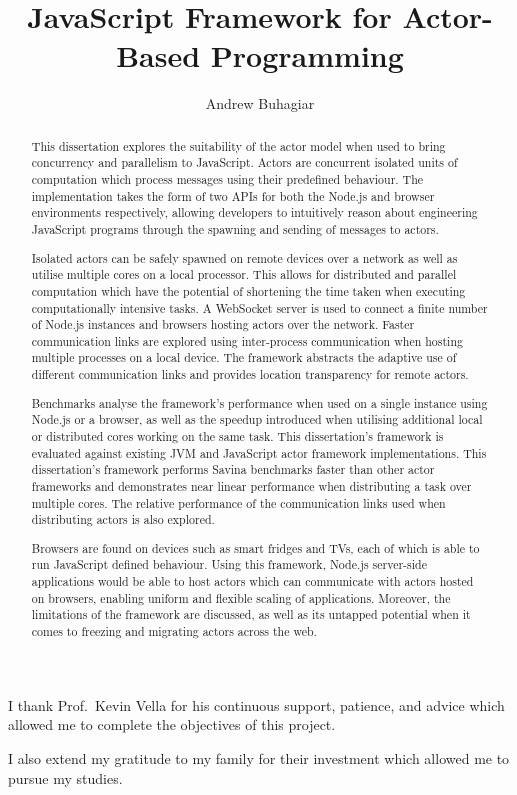 \documentclass[oneside]{um-fict}
\title{JavaScript Framework for Actor-Based Programming}
\author{Andrew Buhagiar}
\begin{document}
\frontmatter 
\maketitle
\begin{acknowledgements}
I thank Prof.\ Kevin Vella for his continuous support, patience, and advice which allowed me to complete the objectives of this project.

I also extend my gratitude to my family for their investment which allowed me to pursue my studies.
\end{acknowledgements}
\begin{abstract}
\hspace{5mm}This dissertation explores the suitability of the actor model when used to bring concurrency and parallelism to JavaScript. Actors are concurrent isolated units of computation which process messages using their predefined behaviour. The implementation takes the form of two APIs for both the Node.js and browser environments respectively, allowing developers to intuitively reason about engineering JavaScript programs through the spawning and sending of messages to actors.

\hspace{5mm}Isolated actors can be safely spawned on remote devices over a network as well as utilise multiple cores on a local processor. This allows for distributed and parallel computation which have the potential of shortening the time taken when executing computationally intensive tasks. A WebSocket server is used to connect a finite number of Node.js instances and browsers hosting actors over the network. Faster communication links are explored using inter-process communication when hosting multiple processes on a local device. The framework abstracts the adaptive use of different communication links and provides location transparency for remote actors.

\hspace{5mm}Benchmarks analyse the framework's performance when used on a single instance using Node.js or a browser, as well as the speedup introduced when utilising additional local or distributed cores working on the same task. This dissertation's framework is evaluated against existing JVM and JavaScript actor framework implementations. This dissertation's framework performs Savina benchmarks faster than other actor frameworks and demonstrates near linear performance when distributing a task over multiple cores. The relative performance of the communication links used when distributing actors is also explored.

\hspace{5mm}Browsers are found on devices such as smart fridges and TVs, each of which is able to run JavaScript defined behaviour. Using this framework, Node.js server-side applications would be able to host actors which can communicate with actors hosted on browsers, enabling uniform and flexible scaling of applications. Moreover, the limitations of the framework are discussed, as well as its untapped potential when it comes to freezing and migrating actors across the web.
\end{abstract}\if@openright\cleardoublepage\else\clearpage\fi
\end{document}
